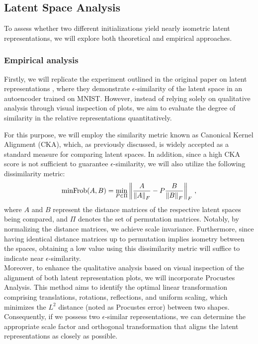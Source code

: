 \documentclass[../main.tex]{subfiles}
\begin{document}
\subsection{Latent Space Analysis}
\label{sec:latent_meth}
To assess whether two different initializations yield nearly isometric latent representations, we will explore both theoretical and empirical approaches.

\subsubsection*{Empirical analysis}
Firstly, we will replicate the experiment outlined in the original paper on latent representations \cite{moschella_relative_2022}, where they demonstrate $\epsilon$-similarity of the latent space in an autoencoder trained on MNIST. However, instead of relying solely on qualitative analysis through visual inspection of plots, we aim to evaluate the degree of similarity in the relative representations quantitatively.

For this purpose, we will employ the similarity metric known as Canonical Kernel Alignment (CKA), which, as previously discussed, is widely accepted as a standard measure for comparing latent spaces. In addition, since a high CKA score is not sufficient to guarantee $\epsilon$-similarity, we will also utilize the following dissimilarity metric:
\[
\text{minFrob}(A,B) = \min_{P\in \Pi} \left\lVert \dfrac{A}{\left\lVert A \right\rVert_F} - P\dfrac{B}{\left\lVert B \right\rVert_F} \right\rVert_F\,,
\]
where $A$ and $B$ represent the distance matrices of the respective latent spaces being compared, and $\Pi$ denotes the set of permutation matrices. Notably, by normalizing the distance matrices, we achieve scale invariance. Furthermore, since having identical distance matrices up to permutation implies isometry between the spaces, obtaining a low value using this dissimilarity metric will suffice to indicate near $\epsilon$-similarity.\\

Moreover, to enhance the qualitative analysis based on visual inspection of the alignment of both latent representation plots, we will incorporate Procustes Analysis. This method aims to identify the optimal linear transformation comprising translations, rotations, reflections, and uniform scaling, which minimizes the $L^2$ distance (noted as Procustes error) between two shapes. Consequently, if we possess two $\epsilon$-similar representations, we can determine the appropriate scale factor and orthogonal transformation that aligns the latent representations as closely as possible.
\end{document}
